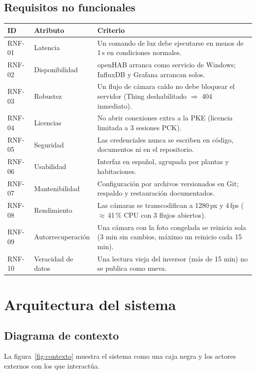 \documentclass[11pt,a4paper]{report}
\begin{document}
\section{Requisitos no funcionales}
\begin{longtable}{@{}p{1.3cm}p{4cm}p{9.5cm}@{}}
\toprule
\textbf{ID} & \textbf{Atributo} & \textbf{Criterio}\\\midrule\endhead
RNF-01 & Latencia & Un comando de luz debe ejecutarse en menos de 1\,s en condiciones normales.\\
RNF-02 & Disponibilidad & openHAB arranca como servicio de Windows; InfluxDB y Grafana arrancan solos.\\
RNF-03 & Robustez & Un flujo de cámara caído no debe bloquear el servidor (Thing deshabilitado $\Rightarrow$ 404 inmediato).\\
RNF-04 & Licencias & No abrir conexiones extra a la PKE (licencia limitada a 3 sesiones PCK).\\
RNF-05 & Seguridad & Las credenciales nunca se escriben en código, documentos ni en el repositorio.\\
RNF-06 & Usabilidad & Interfaz en español, agrupada por plantas y habitaciones.\\
RNF-07 & Mantenibilidad & Configuración por archivos versionados en Git; respaldo y restauración documentados.\\
RNF-08 & Rendimiento & Las cámaras se transcodifican a 1280\,px y 4\,fps ($\approx$\,41\,\% CPU con 3 flujos abiertos).\\
RNF-09 & Autorrecuperación & Una cámara con la foto congelada se reinicia sola (3 min sin cambios, máximo un reinicio cada 15 min).\\
RNF-10 & Veracidad de datos & Una lectura vieja del inversor (más de 15 min) no se publica como nueva.\\
\bottomrule
\end{longtable}

\chapter{Arquitectura del sistema}

\section{Diagrama de contexto}
La figura~\ref{fig:contexto} muestra el sistema como una caja negra y los actores externos con los que
interactúa.
\end{document}
